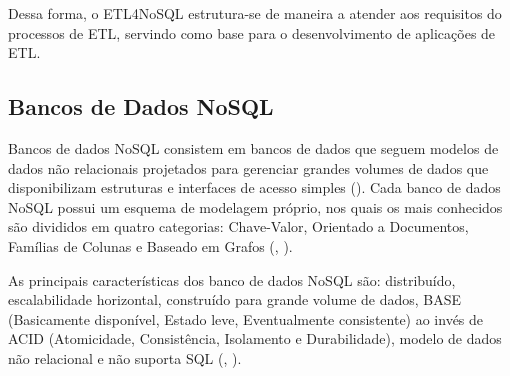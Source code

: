 \begin{itemize}
	
\end{itemize}

Dessa forma, o ETL4NoSQL estrutura-se de maneira a atender aos requisitos do processos de ETL, servindo como base para o desenvolvimento de aplicações de ETL.


\subsection{Bancos de Dados NoSQL}

Bancos de dados NoSQL consistem em bancos de dados que seguem modelos de dados não relacionais projetados para gerenciar grandes volumes de dados que disponibilizam estruturas e interfaces de acesso simples (\cite{lima:2015}). Cada banco de dados NoSQL possui um esquema de modelagem próprio, nos quais os mais conhecidos são divididos em quatro categorias: Chave-Valor, Orientado a Documentos, Famílias de Colunas e Baseado em Grafos (\cite{fowler:2013}, \cite{kaur:2013}).

As principais características dos banco de dados NoSQL são: distribuído, escalabilidade horizontal, construído para grande volume de dados, BASE (Basicamente disponível, Estado leve, Eventualmente consistente) ao invés de ACID (Atomicidade, Consistência, Isolamento e Durabilidade), modelo de dados não relacional e não suporta SQL (\cite{fowler:2013}, \cite{nasholm:2012}).

